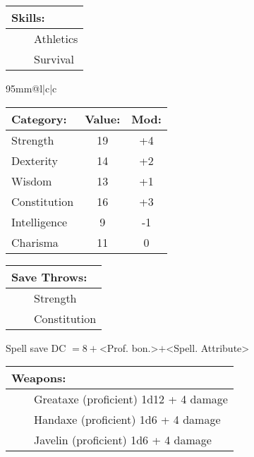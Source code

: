 \documentclass[11pt]{article}
\newcommand{\tabitem}{~~\llap{--}~~}
\begin{document}
\begin{multicols}{2}
\vspace{2mm}

\noindent \begin{tabularx}{95mm}{@{}l}
{\Large \textbf{Skills:}} \\
\hline
\tabitem Athletics \\
\tabitem Survival \\
		\end{tabularx}

\vspace{4mm}

\noindent \begin{tabularx}{95mm}{@{}l|c|c}
 \\
\hline
		\end{tabularx}
\noindent \begin{tabular}{@{}l|c|c}
\textbf{Category:} 			& \textbf{Value:} 	& \textbf{Mod:} \\
\hline
Strength 					& 19 				& +4		\\
Dexterity 					& 14 				& +2		\\
Wisdom 						& 13				& +1		\\
Constitution 				& 16 				& +3		\\
Intelligence 				& 9 				& -1		\\
Charisma 					& 11 				& 0 		\\
		\end{tabular}

\vspace{4mm}

\noindent \begin{tabularx}{95mm}{@{}l}
{\Large \textbf{Save Throws:}} \\
\hline
\tabitem Strength \\
\tabitem Constitution \\
		\end{tabularx}
\noindent Spell save DC $= 8 + $<Prof. bon.>$ + $<Spell. Attribute>

\vspace{4mm}

\noindent \begin{tabularx}{95mm}{@{}l}
{\Large \textbf{Weapons:}} \\
\hline
\tabitem Greataxe (proficient) 1d12 + 4 damage \\
\tabitem Handaxe (proficient) 1d6 + 4 damage \\
\tabitem Javelin (proficient) 1d6 + 4 damage
		\end{tabularx}


\end{multicols}
\end{document}
